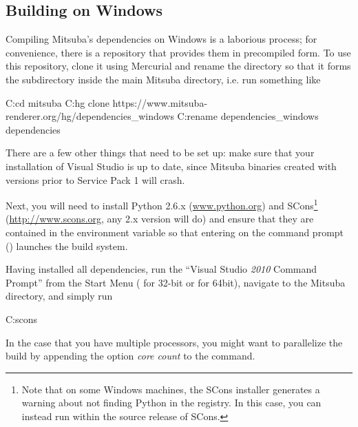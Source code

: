 
\subsection{Building on Windows}
Compiling Mitsuba's dependencies on Windows is a laborious process; for convenience, there
is a repository that provides them in precompiled form. To use this repository, clone it
using Mercurial and rename the directory so that it forms the  subdirectory
inside the main Mitsuba directory, i.e. run something like
\begin{shell}
C:\>cd mitsuba
C:\mitsuba\>hg clone https://www.mitsuba-renderer.org/hg/dependencies_windows
C:\mitsuba\>rename dependencies_windows dependencies
\end{shell}
There are a few other things that need to be set up: make sure that your
installation of Visual Studio is up to date, since Mitsuba binaries created with versions
prior to Service Pack 1 will crash.

Next, you will need to install Python 2.6.x
(\url{www.python.org}) and SCons\footnote{Note that on some Windows machines, the SCons
installer generates a warning about not finding Python in the registry. In this case, you
can instead run  within the source release of SCons.}
(\url{http://www.scons.org}, any 2.x version will do) and ensure that they are contained in the 
environment variable so that entering  on the command prompt ()
launches the build system.

Having installed all dependencies, run the ``Visual Studio \emph{2010} Command
Prompt'' from the Start Menu ( for 32-bit or  for 64bit),
navigate to the Mitsuba directory, and simply run
\begin{shell}
C:\mitsuba\>scons
\end{shell}
In the case that you have multiple processors, you might want to parallelize the build by appending the option \emph{core count} to the  command.

